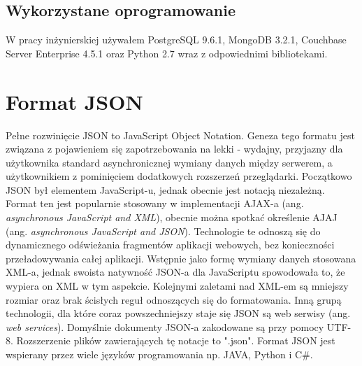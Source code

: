 \documentclass[a4paper,12pt,table]{article}
\begin{document}


\subsection{Wykorzystane oprogramowanie}
W pracy inżynierskiej używałem PostgreSQL 9.6.1, MongoDB 3.2.1, Couchbase Server Enterprise 4.5.1 oraz Python 2.7 wraz z odpowiednimi bibliotekami.
\newpage

\section{Format JSON}
Pełne rozwinięcie JSON to JavaScript Object Notation. Geneza tego formatu jest związana z pojawieniem się zapotrzebowania na lekki - wydajny, przyjazny dla użytkownika standard asynchronicznej wymiany danych między serwerem, a użytkownikiem z pominięciem dodatkowych rozszerzeń przeglądarki. Początkowo JSON był elementem JavaScript-u, jednak obecnie jest notacją niezależną. Format ten jest popularnie stosowany w implementacji AJAX-a (ang. \textit{asynchronous JavaScript and XML}), obecnie można spotkać określenie AJAJ (ang. \textit{asynchronous JavaScript and JSON}). Technologie te odnoszą się do dynamicznego odświeżania fragmentów aplikacji webowych, bez konieczności przeładowywania całej aplikacji. Wstępnie jako formę wymiany danych stosowana XML-a, jednak swoista natywność JSON-a dla JavaScriptu spowodowała to, że wypiera on XML w tym aspekcie. Kolejnymi zaletami nad XML-em są mniejszy rozmiar oraz brak ścisłych reguł odnoszących się do formatowania. Inną grupą technologii, dla które coraz powszechniejszy staje się JSON są web serwisy (ang.\textit{ web services}). Domyślnie dokumenty JSON-a zakodowane są przy pomocy UTF-8. Rozszerzenie plików zawierających tę notacje to ".json". Format JSON jest wspierany przez wiele języków programowania np. JAVA, Python i C\#. \cite{js}
\setlength{\parskip}{1\bigskipamount plus \smallskipamount minus \smallskipamount}
\end{document}
